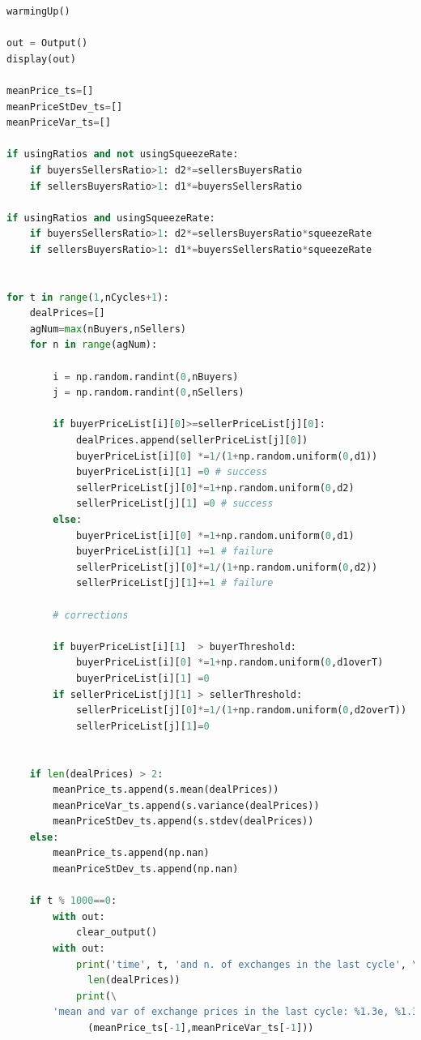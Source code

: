 \documentclass[10pt]{report}
\begin{document}
\begin{appendices}
\begin{lstlisting}[language=Python, caption=The model in the corrupted simplified hayekian perspective, 
label={The listing of model in the corrupted simplified hayekian perspective},basicstyle=\ttfamily\footnotesize]
warmingUp()

out = Output()
display(out)

meanPrice_ts=[]
meanPriceStDev_ts=[]
meanPriceVar_ts=[]

if usingRatios and not usingSqueezeRate:
    if buyersSellersRatio>1: d2*=sellersBuyersRatio
    if sellersBuyersRatio>1: d1*=buyersSellersRatio
        
if usingRatios and usingSqueezeRate:
    if buyersSellersRatio>1: d2*=sellersBuyersRatio*squeezeRate
    if sellersBuyersRatio>1: d1*=buyersSellersRatio*squeezeRate


for t in range(1,nCycles+1):    
    dealPrices=[]
    agNum=max(nBuyers,nSellers)
    for n in range(agNum):

        i = np.random.randint(0,nBuyers)
        j = np.random.randint(0,nSellers)
        
        if buyerPriceList[i][0]>=sellerPriceList[j][0]:
            dealPrices.append(sellerPriceList[j][0])
            buyerPriceList[i][0] *=1/(1+np.random.uniform(0,d1))
            buyerPriceList[i][1] =0 # success
            sellerPriceList[j][0]*=1+np.random.uniform(0,d2)
            sellerPriceList[j][1] =0 # success
        else:
            buyerPriceList[i][0] *=1+np.random.uniform(0,d1)
            buyerPriceList[i][1] +=1 # failure
            sellerPriceList[j][0]*=1/(1+np.random.uniform(0,d2))
            sellerPriceList[j][1]+=1 # failure
            
        # corrections
        
        if buyerPriceList[i][1]  > buyerThreshold:
            buyerPriceList[i][0] *=1+np.random.uniform(0,d1overT)
            buyerPriceList[i][1] =0
        if sellerPriceList[j][1] > sellerThreshold:
            sellerPriceList[j][0]*=1/(1+np.random.uniform(0,d2overT))
            sellerPriceList[j][1]=0
           
           
    if len(dealPrices) > 2:
        meanPrice_ts.append(s.mean(dealPrices))
        meanPriceVar_ts.append(s.variance(dealPrices))
        meanPriceStDev_ts.append(s.stdev(dealPrices))
    else:
        meanPrice_ts.append(np.nan)
        meanPriceStDev_ts.append(np.nan)
        
    if t % 1000==0:
        with out:
            clear_output()
        with out:
            print('time', t, 'and n. of exchanges in the last cycle', \
              len(dealPrices))
            print(\
        'mean and var of exchange prices in the last cycle: %1.3e, %1.3e' %\
              (meanPrice_ts[-1],meanPriceVar_ts[-1]))


\end{lstlisting}
\end{appendices}
\end{document}
